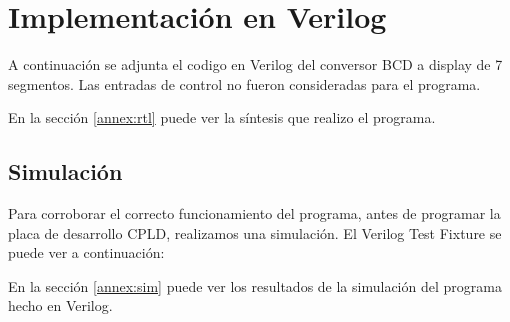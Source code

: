 \chapter{Implementación en Verilog}
  A continuación se adjunta el codigo en Verilog del conversor BCD a display de 7 segmentos. Las entradas de control no
  fueron consideradas para el programa.

  

  En la sección \ref{annex:rtl} puede ver la síntesis que realizo el programa.

  \section{Simulación}
    Para corroborar el correcto funcionamiento del programa, antes de programar la placa de desarrollo CPLD, realizamos
    una simulación. El Verilog Test Fixture se puede ver a continuación:
    
    

    En la sección \ref{annex:sim} puede ver los resultados de la simulación del programa hecho en Verilog.
